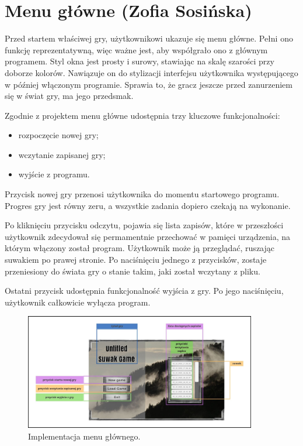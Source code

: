 \section{Menu główne (Zofia Sosińska)}\label{chap:menu_main}
Przed startem właściwej gry, użytkownikowi ukazuje się menu główne. Pełni ono funkcję reprezentatywną, więc ważne jest, aby współgrało ono z głównym programem.
Styl okna jest prosty i surowy, stawiając na skalę szarości przy doborze kolorów. Nawiązuje on do stylizacji interfejsu użytkownika występującego 
w później włączonym programie. Sprawia to, że gracz jeszcze przed zanurzeniem się w świat gry, ma jego przedsmak.

Zgodnie z projektem menu główne udostępnia trzy kluczowe funkcjonalności:
\begin{itemize}
    \item rozpoczęcie nowej gry;
    \item wczytanie zapisanej gry;
    \item wyjście z programu.
\end{itemize}

Przycisk nowej gry przenosi użytkownika do momentu startowego programu. Progres gry jest równy zeru, a wszystkie zadania dopiero czekają na wykonanie.

Po kliknięciu przycisku odczytu, pojawia się lista zapisów, które w przeszłości użytkownik zdecydował się permamentnie przechować w pamięci urządzenia, na którym
włączony został program. Użytkownik może ją przeglądać, ruszając suwakiem po prawej stronie. Po naciśnięciu jednego z przycisków, zostaje przeniesiony 
do świata gry o stanie takim, jaki został wczytany z pliku.

Ostatni przycisk udostępnia funkcjonalność wyjścia z gry. Po jego naciśnięciu, użytkownik całkowicie wyłącza program.
\begin{figure}[htbp]
    \centering
    \includegraphics[width=0.9\textwidth]{images/ui/main_menu.png}
    \caption{Implementacja menu głównego.
    }\label{fig:compass}
\end{figure}
